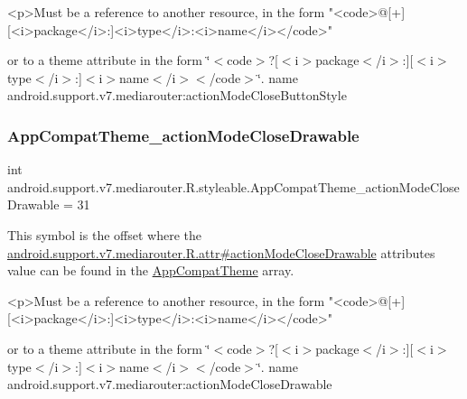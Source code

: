 \begin{DoxyVerb}      <p>Must be a reference to another resource, in the form "<code>@[+][<i>package</i>:]<i>type</i>:<i>name</i></code>"
\end{DoxyVerb}
 or to a theme attribute in the form \char`\"{}$<$code$>$?\mbox{[}$<$i$>$package$<$/i$>$\+:\mbox{]}\mbox{[}$<$i$>$type$<$/i$>$\+:\mbox{]}$<$i$>$name$<$/i$>$$<$/code$>$\char`\"{}.  name android.\+support.\+v7.\+mediarouter\+:action\+Mode\+Close\+Button\+Style \mbox{\label{classandroid_1_1support_1_1v7_1_1mediarouter_1_1R_1_1styleable_a484eb3582d4bbf2518a037875cfd83c2}} 
\subsubsection{\texorpdfstring{App\+Compat\+Theme\+\_\+action\+Mode\+Close\+Drawable}{AppCompatTheme\_actionModeCloseDrawable}}
{\footnotesize\ttfamily int android.\+support.\+v7.\+mediarouter.\+R.\+styleable.\+App\+Compat\+Theme\+\_\+action\+Mode\+Close\+Drawable = 31\hspace{0.3cm}{\ttfamily [static]}}

This symbol is the offset where the \hyperlink{classandroid_1_1support_1_1v7_1_1mediarouter_1_1R_1_1attr_aaa8a7a9c18f17e580e78c69029259bf4}{android.\+support.\+v7.\+mediarouter.\+R.\+attr\#action\+Mode\+Close\+Drawable} attribute\textquotesingle{}s value can be found in the \hyperlink{classandroid_1_1support_1_1v7_1_1mediarouter_1_1R_1_1styleable_a4e3d3900c75d49aeb2f283cac00214d6}{App\+Compat\+Theme} array.

\begin{DoxyVerb}      <p>Must be a reference to another resource, in the form "<code>@[+][<i>package</i>:]<i>type</i>:<i>name</i></code>"
\end{DoxyVerb}
 or to a theme attribute in the form \char`\"{}$<$code$>$?\mbox{[}$<$i$>$package$<$/i$>$\+:\mbox{]}\mbox{[}$<$i$>$type$<$/i$>$\+:\mbox{]}$<$i$>$name$<$/i$>$$<$/code$>$\char`\"{}.  name android.\+support.\+v7.\+mediarouter\+:action\+Mode\+Close\+Drawable \mbox{\label{classandroid_1_1support_1_1v7_1_1mediarouter_1_1R_1_1styleable_ad1238ac3d940ce0698cf6d13ff787b60}} 
